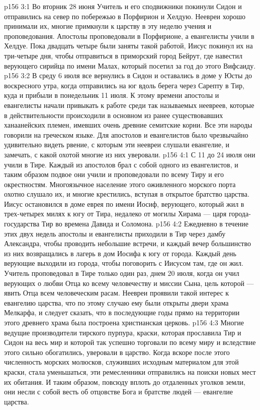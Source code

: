 \vs p156 3:1 Во вторник 28 июня Учитель и его сподвижники покинули Сидон и отправились на север по побережью в Порфирион и Хелдую. Неевреи хорошо принимали их, многие примкнули к царству в эту неделю учения и проповедования. Апостолы проповедовали в Порфирионе, а евангелисты учили в Хелдуе. Пока двадцать четыре были заняты такой работой, Иисус покинул их на три\hyp{}четыре дня, чтобы отправиться в приморский город Бейрут, где навестил верующего сирийца по имени Малах, который посетил за год до этого Вифсаиду.
\vs p156 3:2 В среду 6 июля все вернулись в Сидон и оставались в доме у Юсты до воскресного утра, когда отправились на юг вдоль берега через Сарепту в Тир, куда и прибыли в понедельник 11 июля. К этому времени апостолы и евангелисты начали привыкать к работе среди так называемых неевреев, которые в действительности происходили в основном из ранее существовавших ханаанейских племен, имевших очень древние семитские корни. Все эти народы говорили на греческом языке. Для апостолов и евангелистов было чрезвычайно удивительно видеть рвение, с которым эти неевреи слушали евангелие, и замечать, с какой охотой многие из них уверовали.
\vs p156 4:1 С 11 до 24 июля они учили в Тире. Каждый из апостолов брал с собой одного из евангелистов, и таким образом подвое они учили и проповедовали по всему Тиру и его окрестностям. Многоязычное население этого оживленного морского порта охотно слушало их, и многие крестились, вступая в открытое братство царства. Иисус остановился в доме еврея по имени Иосиф, верующего, который жил в трех\hyp{}четырех милях к югу от Тира, недалеко от могилы Хирама --- царя города\hyp{}государства Тир во времена Давида и Соломона.
\vs p156 4:2 Ежедневно в течение этих двух недель апостолы и евангелисты приходили в Тир через дамбу Александра, чтобы проводить небольшие встречи, и каждый вечер большинство из них возвращались в лагерь в дом Иосифа к югу от города. Каждый день верующие выходили из города, чтобы поговорить с Иисусом там, где он жил. Учитель проповедовал в Тире только один раз, днем 20 июля, когда он учил верующих о любви Отца ко всему человечеству и миссии Сына, цель которой --- явить Отца всем человеческим расам. Неевреи проявили такой интерес к евангелию царства, что по этому случаю ему были открыты двери храма Мелкарфа, и следует сказать, что в последующие годы прямо на территории этого древнего храма была построена христианская церковь.
\vs p156 4:3 Многие ведущие производители тирского пурпура, краски, которая прославила Тир и Сидон на весь мир и которой так успешно торговали по всему миру и вследствие этого сильно обогатились, уверовали в царство. Когда вскоре после этого численность морских молюсков, служивших исходным материалом для этой краски, стала уменьшаться, эти ремесленники отправились на поиски новых мест их обитания. И таким образом, повсюду вплоть до отдаленных уголков земли, они несли с собой весть об отцовстве Бога и братстве людей --- евангелие царства.
